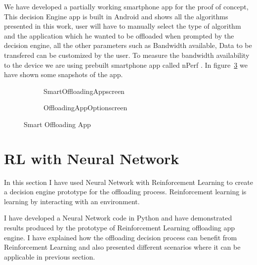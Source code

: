 \documentclass[12pt]{report}
\begin{document}
We have developed a partially working smartphone app for the proof of concept, This decision Engine app is built in Android and shows all the algorithms presented in this work, user will have to manually select the type of algorithm and the application which he wanted to be offloaded when prompted by the decision engine, all the other parameters such as Bandwidth available, Data to be transfered can be customized by the user. To measure the bandwidth availability to the device we are using prebuilt smartphone app called nPerf \cite{nPerf}. 
In figure~\ref{fig:SmartOffloadingApp} we have shown some snapshots of the app.
\begin{figure}[h!]
  \centering
  \begin{subfigure}[b]{0.3\textwidth}
    \caption{SmartOffloadingAppscreen}
    \label{fig:SmartOffloadingAppscreen}
  \end{subfigure}
\quad
  \begin{subfigure}[b]{0.3\textwidth}
    \caption{OffloadingAppOptionscreen}
    \label{fig:SmartOffloadingAppOptionscreen}
  \end{subfigure}

  \caption{Smart Offloading App}\label{fig:SmartOffloadingApp}
\end{figure} 
\section{RL with Neural Network}
In this section I have used Neural Network with Reinforcement Learning to create a decision engine prototype for the offloading process. Reinforcement learning is learning by interacting with an environment. 

I have developed a Neural Network code in Python and have demonstrated results produced by the prototype of Reinforcement Learning offloading app engine.
I have explained how the offloading decision process can benefit from Reinforcement Learning and also presented different scenarios where it can be applicable in previous section.
\end{document}
